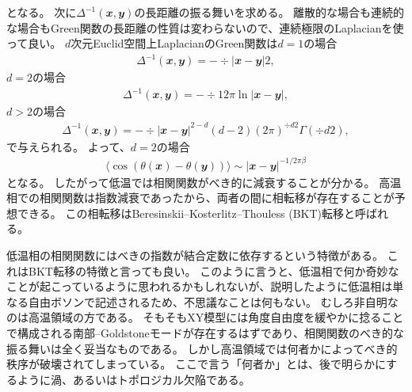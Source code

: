\documentclass[12pt]{ltjsarticle}
\begin{document}
となる。
次に$Δ^{-1}(𝒙, 𝒚)$の長距離の振る舞いを求める。
離散的な場合も連続的な場合もGreen関数の長距離の性質は変わらないので、連続極限のLaplacianを使って良い。
$d$次元Euclid空間上LaplacianのGreen関数は$d=1$の場合
\begin{align}
    Δ^{-1}(𝒙,𝒚) = -÷{|𝒙-𝒚|}{2},
\end{align}
$d=2$の場合
\begin{align}
    Δ^{-1}(𝒙,𝒚) = -÷1{2π} \ln |𝒙-𝒚|,
\end{align}
$d > 2$の場合
\begin{align}
    Δ^{-1}(𝒙,𝒚) = -÷{|𝒙-𝒚|^{2-d}}{(d-2)(2π)^{÷{d}{2}}Γ(÷{d}{2})},
\end{align}
で与えられる。
よって、$d=2$の場合
\begin{align}
    ⟨\cos(θ(𝒙)-θ(𝒚))⟩ ∼ |𝒙 - 𝒚|^{-1/2𝜋β}
\end{align}
となる。
したがって低温では相関関数がべき的に減衰することが分かる。
高温相での相関関数は指数減衰であったから、両者の間に相転移が存在することが予想できる。
この相転移はBeresinskii--Kosterlitz--Thouless (BKT)転移と呼ばれる。

低温相の相関関数にはべきの指数が結合定数に依存するという特徴がある。
これはBKT転移の特徴と言っても良い。
このように言うと、低温相で何か奇妙なことが起こっているように思われるかもしれないが、説明したように低温相は単なる自由ボソンで記述されるため、不思議なことは何もない。
むしろ非自明なのは高温領域の方である。
そもそもXY模型には角度自由度を緩やかに捻ることで構成される南部--Goldstoneモードが存在するはずであり、相関関数のべき的な振る舞いは全く妥当なものである。
しかし高温領域では何者かによってべき的秩序が破壊されてしまっている。
ここで言う「何者か」とは、後で明らかにするように渦、あるいはトポロジカル欠陥である。
\end{document}
